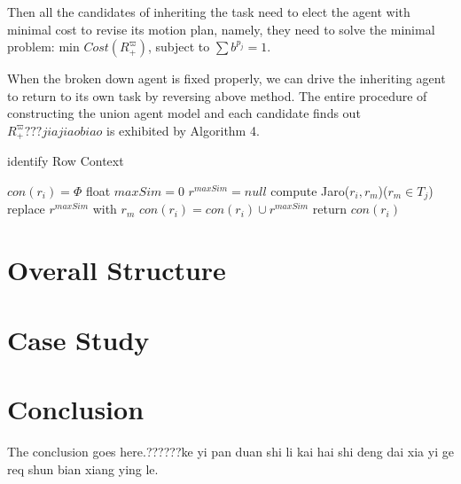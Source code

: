 \documentclass[journal]{IEEEtran}
\begin{document}
Then all the candidates of inheriting the task need to elect the agent with minimal cost to revise its motion plan, namely, they need to solve the minimal problem: min $Cost(R^{\varpi}_+)$, subject to $\sum b^{p_j}=1$.\par
When the broken down agent is fixed properly, we can drive the inheriting agent to return to its own task by reversing above method. The entire procedure of constructing the union agent model and each candidate finds out $R^{\varpi}_+???jia jiao biao$ is exhibited by Algorithm 4.

\begin{algorithm}
  \caption{identify Row Context}
  $con(r_i)= \Phi$\;
  {
    float $maxSim=0$\;
    $r^{maxSim}=null$\;
    {
      compute Jaro($r_i,r_m$)($r_m\in T_j$)\;
      {
        replace $r^{maxSim}$ with $r_m$\;
      }
    }
    $con(r_i)=con(r_i)\cup {r^{maxSim}}$\;
  }
  return $con(r_i)$\;
\end{algorithm}

\section{Overall Structure}

\section{Case Study}

\section{Conclusion}
The conclusion goes here.??????ke yi pan duan shi li kai hai shi deng dai xia yi ge req shun bian xiang ying le.





\end{document}
